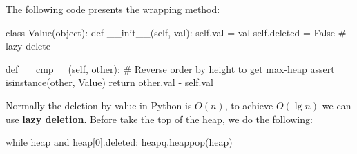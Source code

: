 The following code presents the wrapping method:
\begin{python}
class Value(object):
    def __init__(self, val):
        self.val = val
        self.deleted = False  # lazy delete 

    def __cmp__(self, other):
        # Reverse order by height to get max-heap
        assert isinstance(other, Value)
        return other.val - self.val
\end{python}

Normally the deletion by value in Python is $O(n)$, to achieve $O(\lg n)$ we can use \textbf{lazy deletion}. Before take the top of the heap, we do the following:
\begin{python}
while heap and heap[0].deleted:
    heapq.heappop(heap)
\end{python}
